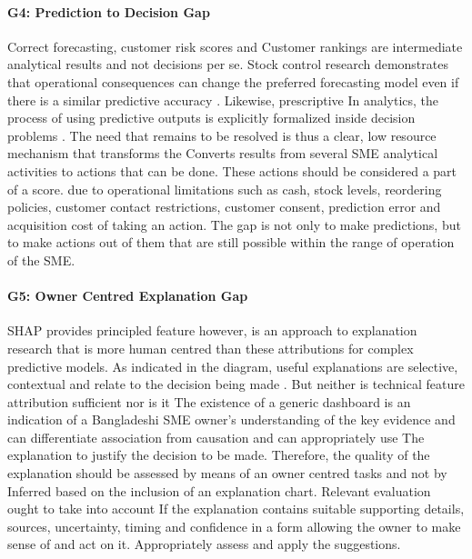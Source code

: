 \documentclass[a4paper,11pt,oneside]{book}
\theoremstyle{plain}
\theoremstyle{definition}
\theoremstyle{remark}
\begin{document}
\paragraph{G4: Prediction to Decision Gap}
Correct forecasting, customer risk scores and Customer rankings are intermediate analytical results and not decisions per se. Stock control research demonstrates that operational consequences can change the preferred forecasting model even if there is a similar predictive accuracy \cite{syntetos2010stock}. Likewise, prescriptive In analytics, the process of using predictive outputs is explicitly formalized inside decision problems \cite{bertsimas2020prescriptive}. The need that remains to be resolved is thus a clear, low resource mechanism that transforms the Converts results from several SME analytical activities to actions that can be done. These actions should be considered a part of a score. due to operational limitations such as cash, stock levels, reordering policies, customer contact restrictions, customer consent, prediction error and acquisition cost of taking an action. The gap is not only to make predictions, but to make actions out of them that are still possible within the range of operation of the SME.

\paragraph{G5: Owner Centred Explanation Gap}
SHAP provides principled feature however, is an approach to explanation research that is more human centred than these attributions for complex predictive models. As indicated in the diagram, useful explanations are selective, contextual and relate to the decision being made \cite{miller2019explanation}. But neither is technical feature attribution sufficient nor is it The existence of a generic dashboard is an indication of a Bangladeshi SME owner's understanding of the key evidence and can differentiate association from causation and can appropriately use The explanation to justify the decision to be made. Therefore, the quality of the explanation should be assessed by means of an owner centred tasks and not by Inferred based on the inclusion of an explanation chart. Relevant evaluation ought to take into account If the explanation contains suitable supporting details, sources, uncertainty, timing and confidence in a form allowing the owner to make sense of and act on it. Appropriately assess and apply the suggestions.
\end{document}
